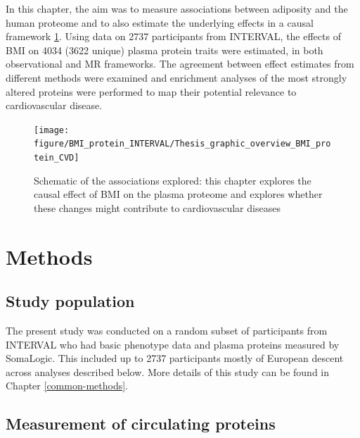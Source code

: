 \documentclass[11pt,twoside]{bristolthesis}
\begin{document}
In this chapter, the aim was to measure associations between adiposity and the human proteome and to also estimate the underlying effects in a causal framework \ref{fig:BMI-protein-graphic}. Using data on 2737 participants from INTERVAL, the effects of BMI on 4034 (3622 unique) plasma protein traits were estimated, in both observational and MR frameworks. The agreement between effect estimates from different methods were examined and enrichment analyses of the most strongly altered proteins were performed to map their potential relevance to cardiovascular disease.
\begin{figure}
\texttt{[image: figure/BMI\_protein\_INTERVAL/Thesis\_graphic\_overview\_BMI\_protein\_CVD]} \caption[Schematic of the associations explored in chapter]{Schematic of the associations explored: this chapter explores the causal effect of BMI on the plasma proteome and explores whether these changes might contribute to cardiovascular diseases}\label{fig:BMI-protein-graphic}
\end{figure}
\hypertarget{methods-3}{%
\section{Methods}\label{methods-3}}

\hypertarget{study-population-2}{%
\subsection{Study population}\label{study-population-2}}

The present study was conducted on a random subset of participants from INTERVAL who had basic phenotype data and plasma proteins measured by SomaLogic. This included up to 2737 participants mostly of European descent across analyses described below. More details of this study can be found in Chapter \ref{common-methods}.

\hypertarget{measurement-of-circulating-proteins}{%
\subsection{Measurement of circulating proteins}\label{measurement-of-circulating-proteins}}
\end{document}
